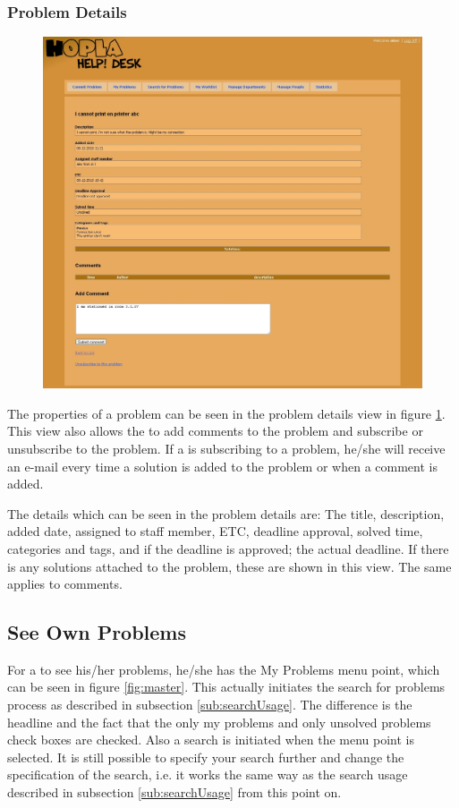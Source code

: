 \subsubsection{Problem Details}
\begin{figure}[htb]
	\centering
		\includegraphics[width=1.00\textwidth, clip=true, trim=2.9cm 0.5cm 3cm 8cm]{input/implementation/program_presentation/problemDetails.png}
	\label{fig:problemDetails}
\end{figure}
The properties of a problem can be seen in the problem details view in figure \ref{fig:problemDetails}.
This view also allows the \aclient[] to add comments to the problem and subscribe or unsubscribe to the problem.
If a \aclient[] is subscribing to a problem, he/she will receive an e-mail every time a solution is added to the problem or when a comment is added.

The details which can be seen in the problem details are: The title, description, added date, assigned to staff member, ETC, deadline approval, solved time, categories and tags, and if the deadline is approved; the actual deadline.
If there is any solutions attached to the problem, these are shown in this view.
The same applies to comments.

\subsection{See Own Problems}
\label{sub:myProblem}
For a \aclient[] to see his/her problems, he/she has the My Problems menu point, which can be seen in figure \ref{fig:master}.
This actually initiates the search for problems process as described in subsection \ref{sub:searchUsage}.
The difference is the headline and the fact that the only my problems and only unsolved problems check boxes are checked.
Also a search is initiated when the menu point is selected.
It is still possible to specify your search further and change the specification of the search, i.e. it works the same way as the search usage described in subsection \ref{sub:searchUsage} from this point on.

